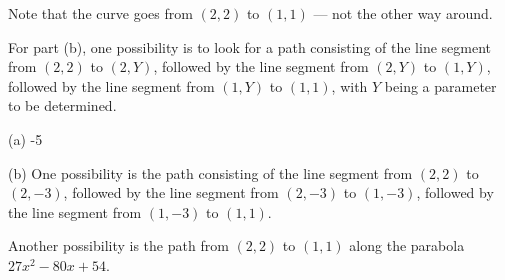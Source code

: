 \begin{hint} 
	Note that the curve goes from $(2,2)$ to $(1,1)$ --- not the other way around.
	
	For part (b), one possibility is to look for a path
	consisting of the line segment from $(2,2)$ to $(2,Y)$, followed by 
	the line segment from $(2,Y)$ to $(1,Y)$, followed by the line 
	segment from $(1,Y)$ to $(1,1)$, with $Y$ being a parameter to be determined.
\end{hint}

\begin{answer} 
	(a) -5
	
	(b) One possibility is the path consisting of the line
	segment from $(2,2)$ to $(2,-3)$, followed by the line segment from
	$(2,-3)$ to $(1,-3)$, followed by the line segment from $(1,-3)$ to $(1,1)$.
	
	Another possibility is the path from $(2,2)$ to $(1,1)$ along the parabola $27x^2-80x+54$.
\end{answer}

